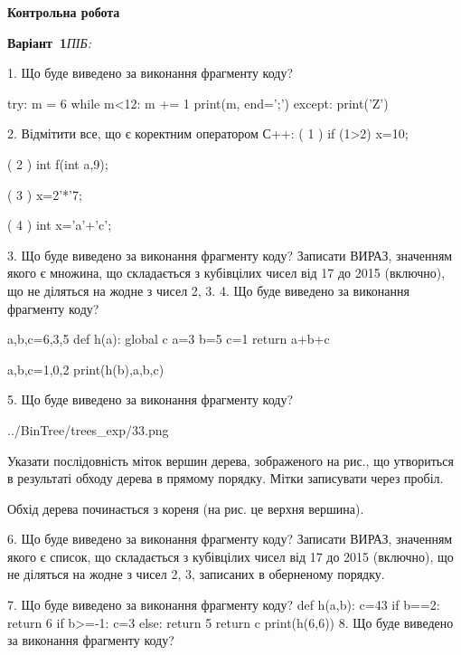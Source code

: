 \documentclass[11pt]{article}
\begin{document}
{\large\textbf{Контрольна робота}}

\textbf{Варіант \No\,1}\hfill \textit{ПІБ:}\,\underline{\hspace{60mm}}
\vspace{4mm}

1. Що буде виведено за виконання фрагменту коду?

try:
    m = 6
    while m<12:
        m += 1
    print(m, end=';')
except:
    print('Z')


2. %
Відмітити все, що є коректним оператором С++:
( 1 ) if (1>2) x=10;

( 2 ) int f(int a,9);

( 3 ) x=2'*'7;

( 4 ) int x='a'+'c';

3. Що буде виведено за виконання фрагменту коду?
Записати ВИРАЗ, значенням якого є множина, що складається з кубівцілих чисел від 17 до 2015 (включно), що не діляться на жодне з чисел 2, 3.
4. Що буде виведено за виконання фрагменту коду?

a,b,c=6,3,5
def h(a):
global c    a=3
    b=5
    c=1
    return a+b+c

a,b,c=1,0,2
print(h(b),a,b,c)

5. Що буде виведено за виконання фрагменту коду?

\begin{center}
	{../BinTree/trees_exp/33.png}
\end{center}
Указати послідовність міток вершин дерева, зображеного на рис., що утвориться в результаті обходу дерева в прямому порядку. Мітки записувати через пробіл.\par Обхід дерева починається з кореня (на рис. це верхня вершина).

6. Що буде виведено за виконання фрагменту коду?
Записати ВИРАЗ, значенням якого є список, що складається з кубівцілих чисел від 17 до 2015 (включно), що не діляться на жодне з чисел 2, 3, записаних в обернено\-му порядку.

7. Що буде виведено за виконання фрагменту коду?
def h(a,b):
      c=43
      if b==2: return 6
      if b>=-1: c=3
      else: return 5
      return c
   print(h(6,6))
8. Що буде виведено за виконання фрагменту коду?
\end{document}
